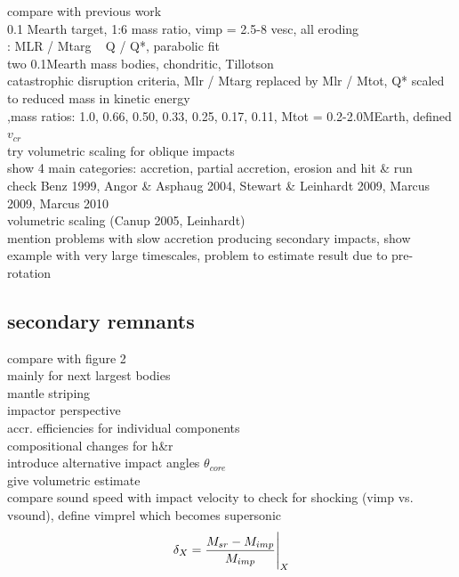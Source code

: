 compare with previous work\\
\cite{Benz:1988p3336} 0.1 Mearth target, 1:6 mass ratio, vimp = 2.5-8 vesc, all eroding\\
\cite{Benz1999Icar..142....5B}: MLR / Mtarg ~ Q / Q*, parabolic fit \\
\cite{Agnor:2004p3329}  two 0.1Mearth mass bodies, chondritic, Tillotson \\
\cite{Stewart:2009p3265} catastrophic disruption criteria, Mlr / Mtarg replaced by Mlr / Mtot, Q* scaled to reduced mass in kinetic energy \\ 
\cite{2010ApJ...714L..21K} ,mass ratios: 1.0, 0.66, 0.50, 0.33, 0.25, 0.17, 0.11, Mtot = 0.2-2.0MEarth, defined $v_{cr}$ \\
try volumetric scaling for oblique impacts \\
show 4 main categories: accretion, partial accretion, erosion and hit \& run \\
check Benz 1999, Angor \& Asphaug 2004, Stewart \& Leinhardt 2009, Marcus 2009, Marcus 2010 \\
volumetric scaling (Canup 2005, Leinhardt) \\
mention problems with slow accretion producing secondary impacts, show example with very large timescales, problem to estimate result due to pre-rotation\\




\subsection{secondary remnants}
\cite{Agnor:2004p3329} compare with figure 2\\

mainly for next largest bodies\\
mantle striping\\
impactor perspective\\
accr. efficiencies for individual components \\
compositional changes for h\&r \\
introduce alternative impact angles $\theta_{core}$ \\
give volumetric estimate \\
compare sound speed with impact velocity to check for shocking (vimp vs. vsound), define vimprel which becomes supersonic \\

\begin{equation}
\delta_X = \frac{M_{sr} - M_{imp}}{M_{imp}} \Bigg|_{X}
\end{equation}

